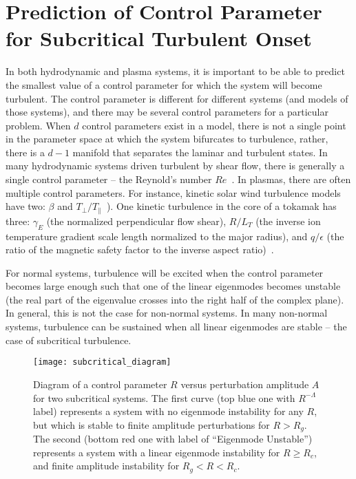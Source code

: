 \documentclass[letter,scriptaddress,twocolumn, prl,showkeys]{revtex4}
\def\para{\parallel}
\begin{document}
\section{Prediction of Control Parameter for Subcritical Turbulent Onset}

In both hydrodynamic and plasma systems, it is important to be able to predict the smallest value of a control parameter for which the system will become turbulent. 
The control parameter is different for different systems (and models of those systems), and there may be several control parameters for a particular problem. 
When $d$ control parameters exist in a model, 
there is not a single point in the parameter space at which the system bifurcates to turbulence, rather, there is a $d-1$ manifold that separates the laminar and turbulent states.
In many hydrodynamic systems driven turbulent by shear flow, there is generally a single control parameter -- the Reynold's number $Re$~\cite{drazin1981}.
In plasmas, there are often multiple control parameters. For instance, kinetic solar wind turbulence models have two: $\beta$ and $T_\perp/T_\para$~\cite{camporeale2010}). One kinetic turbulence in the
core of a tokamak has three: $\gamma_E$ (the normalized perpendicular flow shear), $R/L_T$ (the inverse ion temperature gradient scale length normalized to the major radius), and $q/\epsilon$
(the ratio of the magnetic safety factor to the inverse aspect ratio)~\cite{highcock2012}.

For normal systems, turbulence will be excited when the control parameter becomes large enough such that one of the linear eigenmodes becomes unstable (the real part of the eigenvalue crosses into the
right half of the complex plane). In general, this is not the case for non-normal systems. In many non-normal systems, turbulence can be sustained when all linear eigenmodes are stable --
the case of subcritical turbulence. 

\begin{figure}
\centerline{\texttt{[image: subcritical\_diagram]}}
\caption{Diagram of a control parameter $R$ versus perturbation amplitude $A$ for two subcritical systems. The first curve (top blue one with $R^{-\Lambda}$ label) represents a system with no
eigenmode instability for any $R$, but which is stable to finite amplitude perturbations for $R > R_g$. 
The second (bottom red one with label of ``Eigenmode Unstable'') represents a system with a linear eigenmode instability for $R \ge R_c$, and finite amplitude
instability for $R_g < R < R_c$.}
\label{subcritical_diagram}
\end{figure}
\end{document}
